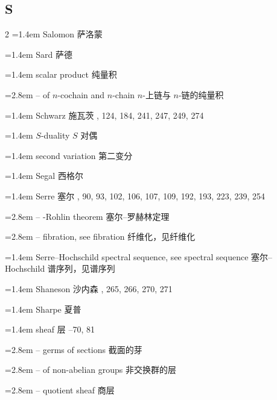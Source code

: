 \subsection*{S}
\small
\begin{multicols}{2}
\noindent\hangindent=1.4em Salomon \quad 萨洛蒙 \par
\noindent\hangindent=1.4em Sard \quad 萨德 \par
\noindent\hangindent=1.4em scalar product \quad 纯量积 \quad\par
\noindent\hangindent=2.8em -- of $n$-cochain and $n$-chain \quad $n$-上链与 $n$-链的纯量积 \par
\noindent\hangindent=1.4em Schwarz \quad 施瓦茨 , 124, 184, 241, 247, 249, 274\par
\noindent\hangindent=1.4em $S$-duality \quad $S$ 对偶 \par
\noindent\hangindent=1.4em second variation \quad 第二变分 \par
\noindent\hangindent=1.4em Segal \quad 西格尔 \par
\noindent\hangindent=1.4em Serre \quad 塞尔 , 90, 93, 102, 106, 107, 109, 192, 193, 223, 239, 254\par
\noindent\hangindent=2.8em -- -Rohlin theorem \quad 塞尔--罗赫林定理 \par
\noindent\hangindent=2.8em -- fibration, see fibration \quad 纤维化，见纤维化 \quad\par
\noindent\hangindent=1.4em Serre--Hochschild spectral sequence, see spectral sequence \quad 塞尔--Hochschild 谱序列，见谱序列 \quad\par
\noindent\hangindent=1.4em Shaneson \quad 沙内森 , 265, 266, 270, 271\par
\noindent\hangindent=1.4em Sharpe \quad 夏普 \par
\noindent\hangindent=1.4em sheaf \quad 层 --70, 81\par
\noindent\hangindent=2.8em -- germs of sections \quad 截面的芽 \par
\noindent\hangindent=2.8em -- of non-abelian groups \quad 非交换群的层 \par
\noindent\hangindent=2.8em -- quotient sheaf \quad 商层 \par

\end{multicols}
